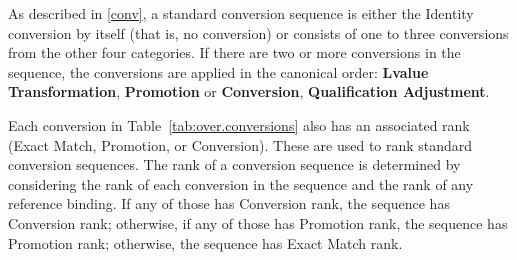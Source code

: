 \pnum
\begin{note}
As described in \ref{conv},
a standard conversion sequence is either the Identity conversion
by itself (that is, no conversion) or consists of one to three
conversions from the other
four categories.
If there are two or more conversions in the sequence, the
conversions are applied in the canonical order:
\textbf{Lvalue Transformation},
\textbf{Promotion}
or
\textbf{Conversion},
\textbf{Qualification Adjustment}.
\end{note}

\pnum
{}%
Each conversion in Table~\ref{tab:over.conversions}
also has an associated rank (Exact
Match, Promotion, or Conversion).
These are used
to rank standard conversion sequences.
The rank of a conversion sequence is determined by considering the
rank of each conversion in the sequence and the rank of any reference
binding.
If any of those has Conversion rank, the
sequence has Conversion rank; otherwise, if any of those has Promotion rank,
the sequence has Promotion rank; otherwise, the sequence has Exact
Match rank.

